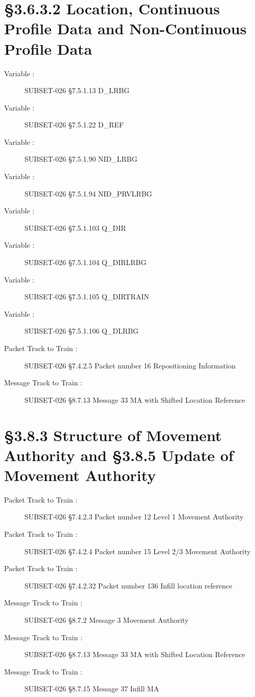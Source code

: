 \documentclass{template/openetcs_report}
\begin{document}
\section{\S3.6.3.2 Location, Continuous Profile Data and Non-Continuous Profile Data}
\begin{description}
\item [Variable :] SUBSET-026 \S7.5.1.13 D\_LRBG
\item [Variable :] SUBSET-026 \S7.5.1.22 D\_REF
\item [Variable :] SUBSET-026 \S7.5.1.90 NID\_LRBG
\item [Variable :] SUBSET-026 \S7.5.1.94 NID\_PRVLRBG
\item [Variable :] SUBSET-026 \S7.5.1.103 Q\_DIR
\item [Variable :] SUBSET-026 \S7.5.1.104 Q\_DIRLRBG
\item [Variable :] SUBSET-026 \S7.5.1.105 Q\_DIRTRAIN
\item [Variable :] SUBSET-026 \S7.5.1.106 Q\_DLRBG
\item [Packet Track to Train :] SUBSET-026 \S7.4.2.5 Packet number 16	Repositioning Information
\item [Message Track to Train :] SUBSET-026 \S8.7.13 Message 33 MA with Shifted Location Reference
\end{description}

\section{\S3.8.3 Structure of Movement Authority and §3.8.5 Update of Movement Authority}
\begin{description}
\item [Packet Track to Train :] SUBSET-026 \S7.4.2.3 Packet number 12 Level 1 Movement Authority
\item [Packet Track to Train :] SUBSET-026 \S7.4.2.4 Packet number 15 Level 2/3 Movement Authority 
\item [Packet Track to Train :] SUBSET-026 \S7.4.2.32 Packet number 136 Infill location reference
\item [Message Track to Train :] SUBSET-026 \S8.7.2 Message 3 Movement Authority
\item [Message Track to Train :] SUBSET-026 \S8.7.13 Message 33 MA with Shifted Location Reference
\item [Message Track to Train :] SUBSET-026 \S8.7.15 Message 37 Infill MA
\end{description}
\end{document}
